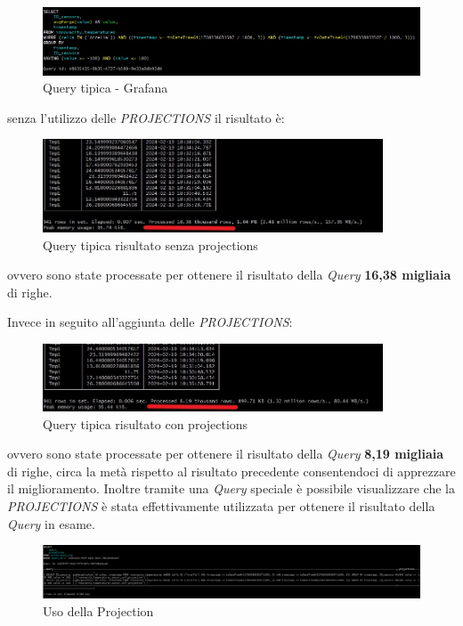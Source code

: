     \begin{figure}[H]
        \centering
        \includegraphics[width=1\textwidth]{../Images/SpecificaTecnica/ProjectionQuery.jpg}
        \caption{Query tipica - Grafana}
        \label{fig:ProjectionsQuery}
      \end{figure}
    senza l'utilizzo delle \textit{PROJECTIONS} il risultato è:
    \begin{figure}[H]
        \centering
        \includegraphics[width=0.9\textwidth]{../Images/SpecificaTecnica/SenzaProectionResult.jpg}
        \caption{Query tipica risultato senza projections}
        \label{fig:ProjectionsQueryWthout}
      \end{figure}
      ovvero sono state processate per ottenere il risultato della \textit{Query} \textbf{16,38 migliaia} di righe.

      Invece in seguito all'aggiunta delle \textit{PROJECTIONS}:
      \begin{figure}[H]
        \centering
        \includegraphics[width=0.9\textwidth]{../Images/SpecificaTecnica/ConProjectionRisultato.jpg}
        \caption{Query tipica risultato con projections}
        \label{fig:ProjectionsQueryWith}
      \end{figure}   
  ovvero sono state processate per ottenere il risultato della \textit{Query} \textbf{8,19 migliaia} di righe, circa la metà rispetto al risultato precedente consentendoci di apprezzare il miglioramento.
Inoltre tramite una \textit{Query} speciale è possibile visualizzare che la \textit{PROJECTIONS} è stata effettivamente utilizzata per ottenere il risultato della \textit{Query} in esame.
\begin{figure}[H]
    \centering
    \includegraphics[width=1\textwidth]{../Images/SpecificaTecnica/ProjectionUsedByClickHouse.jpg}
    \caption{Uso della Projection}
    \label{fig:ProjectionsUsed}
\end{figure}

